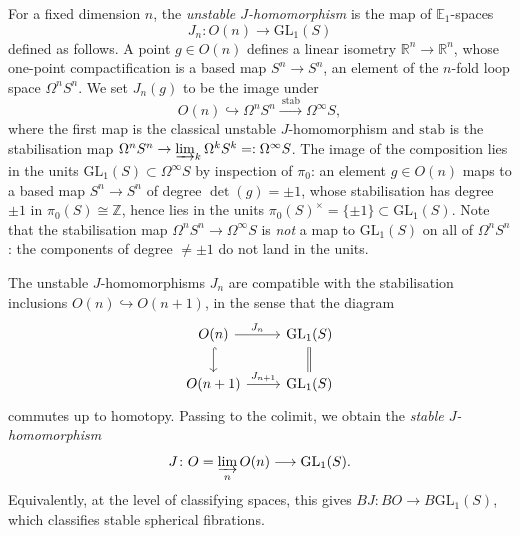 \documentclass{amsart}
\begin{document}
\begin{definition}
\label{def:Jn}
For a fixed dimension $n$, the \emph{unstable $J$-homomorphism} is the map of $\mathbb{E}_1$-spaces
\[
J_n \colon O(n) \longrightarrow \mathrm{GL}_1(S)
\]
defined as follows. A point $g \in O(n)$ defines a linear isometry $\mathbb{R}^n \to \mathbb{R}^n$, whose one-point compactification is a based map $S^n \to S^n$, an element of the $n$-fold loop space $\Omega^n S^n$. We set $J_n(g)$ to be the image under
\[
O(n) \hookrightarrow \Omega^n S^n \xrightarrow{\ \text{stab}\ } \Omega^\infty S,
\]
where the first map is the classical unstable $J$-homomorphism \cite[pp.~291--293]{Atiyah1961} and $\text{stab}$ is the stabilisation map $\Omega^n S^n \to \varinjlim_k \Omega^k S^k =: \Omega^\infty S$. The image of the composition lies in the units $\mathrm{GL}_1(S) \subset \Omega^\infty S$ by inspection of $\pi_0$: an element $g \in O(n)$ maps to a based map $S^n \to S^n$ of degree $\det(g) = \pm 1$, whose stabilisation has degree $\pm 1$ in $\pi_0(S) \cong \mathbb{Z}$, hence lies in the units $\pi_0(S)^\times = \{\pm 1\} \subset \mathrm{GL}_1(S)$. Note that the stabilisation map $\Omega^n S^n \to \Omega^\infty S$ is \emph{not} a map to $\mathrm{GL}_1(S)$ on all of $\Omega^n S^n$: the components of degree $\neq \pm 1$ do not land in the units.
\end{definition}

The unstable $J$-homomorphisms $J_n$ are compatible with the stabilisation inclusions $O(n) \hookrightarrow O(n+1)$, in the sense that the diagram
\[
\begin{tikzcd}
O(n) \arrow[r, "J_n"] \arrow[d, hook] & \mathrm{GL}_1(S) \arrow[d, equal] \\
O(n+1) \arrow[r, "J_{n+1}"] & \mathrm{GL}_1(S)
\end{tikzcd}
\]
commutes up to homotopy. Passing to the colimit, we obtain the \emph{stable $J$-homomorphism}
\[
J \colon O = \varinjlim_n O(n) \longrightarrow \mathrm{GL}_1(S).
\]
Equivalently, at the level of classifying spaces, this gives $BJ \colon BO \to B\mathrm{GL}_1(S)$, which classifies stable spherical fibrations.
\end{document}
